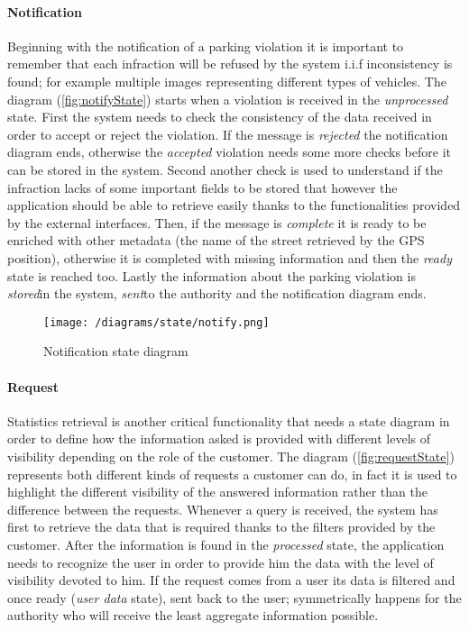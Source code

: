 	\paragraph{Notification}
		Beginning with the notification of a parking violation it is important to remember that each infraction will be refused by the system i.i.f inconsistency is found; for example multiple images representing different types of vehicles.
		The diagram (\autoref{fig:notifyState}) starts when a violation is received in the \textit{unprocessed} state. First the system needs to check the consistency of the data received in order to accept or reject the violation. If the message is \textit{rejected} the notification diagram ends, otherwise the \textit{accepted} violation needs some more checks before it can be stored in the system. Second another check is used to understand if the infraction lacks of some important fields to be stored that however the application should be able to retrieve easily thanks to the functionalities provided by the external interfaces. Then, if the message is \textit{complete} it is ready to be enriched with other metadata (the name of the street retrieved by the GPS position), otherwise it is completed with missing information and then the \textit{ready} state is reached too. Lastly the information about the parking violation is \textit{stored}in the system, \textit{sent}to the authority and the notification diagram ends.
		
		\vspace{0.3cm}
		\begin{figure}[h]
			\centering
			\texttt{[image: /diagrams/state/notify.png]}
			\caption{\label{fig:notifyState}Notification state diagram}
		\end{figure}
	
	\paragraph{Request}
		Statistics retrieval is another critical functionality that needs a state diagram in order to define how the information asked is provided with different levels of visibility depending on the role of the customer.
		The diagram (\autoref{fig:requestState}) represents both different kinds of requests a customer can do, in fact it is used to highlight the different visibility of the answered information rather than the difference between the requests. Whenever a query is received, the system has first to retrieve the data that is required thanks to the filters provided by the customer. After the information is found in the \textit{processed} state, the application needs to recognize the user in order to provide him the data with the level of visibility devoted to him. If the request comes from a user its data is filtered and once ready (\textit{user data} state), sent back to the user; symmetrically happens for the authority who will receive the least aggregate information possible. 
		
